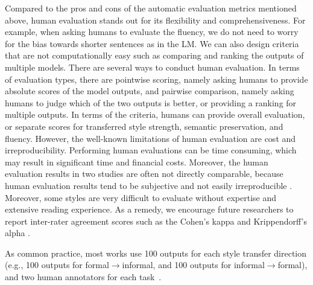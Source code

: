 Compared to the pros and cons of the automatic evaluation metrics mentioned above, human evaluation stands out for its flexibility and comprehensiveness. For example, when asking humans to evaluate the fluency, we do not need to worry for the bias towards shorter sentences as in the LM. We can also design criteria that are not computationally easy such as comparing and ranking the outputs of multiple models. There are several ways to conduct human evaluation. In terms of evaluation types, there are pointwise scoring, namely asking humans to provide absolute scores of the model outputs, and pairwise comparison, namely asking humans to judge which of the two outputs is better, or providing a ranking for multiple outputs.
In terms of the criteria, humans can provide overall evaluation, or separate scores for transferred style strength, semantic preservation, and fluency.
However, the well-known limitations of human evaluation are cost and  irreproducibility.
Performing human evaluations can be time consuming, which may result in significant time and financial costs. Moreover, the human evaluation results in two studies are often not directly comparable, because human evaluation results tend to be subjective and not easily irreproducible . Moreover, some styles are very difficult to evaluate without expertise and extensive reading experience.
As a remedy, we encourage future researchers to report inter-rater agreement scores such as the Cohen's kappa  and Krippendorff's alpha . 

As common practice, most works use 100 outputs for each style transfer direction (e.g., 100 outputs for formal$\rightarrow$informal, and 100 outputs for informal$\rightarrow$formal), and two human annotators for each task~.

